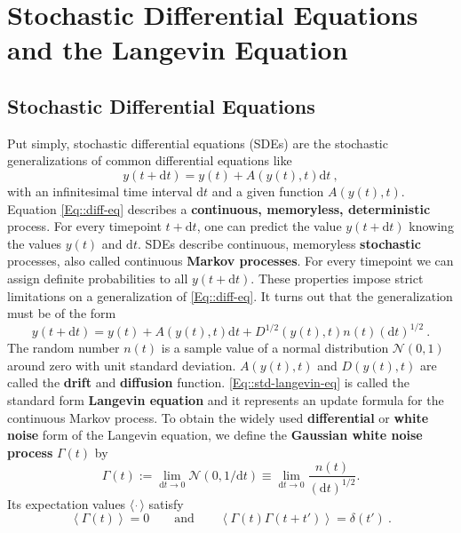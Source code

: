 	\section{Stochastic Differential Equations and the Langevin Equation}
	\subsection{Stochastic Differential Equations}
	Put simply, stochastic differential equations (SDEs) are the stochastic generalizations of common differential equations like
	\begin{equation} \label{Eq::diff-eq}
		y(t + \text{d}t) =	y(t) + A(y(t), t) \mathrm{d}t ~,
	\end{equation}
	with an  infinitesimal time interval $\text{d}t$ and a given function $A(y(t), t)$. Equation \eqref{Eq::diff-eq} describes a \textbf{continuous, memoryless, deterministic} process. For every timepoint $t + \text{d}t$, one can predict the value $y(t+\text{d}t)$ knowing the values $y(t)$ and $\text{d}t$. SDEs describe continuous, memoryless \textbf{stochastic} processes, also called continuous \textbf{Markov processes}. For every timepoint we can assign definite probabilities to all $y(t + \text{d}t)$. These properties impose strict limitations on a generalization of \autoref{Eq::diff-eq}. It turns out that the generalization must be of the form \cite{gillespie1996mathematics}
	\begin{equation} \label{Eq::std-langevin-eq}
		y(t + \text{d}t) =	y(t) + A(y(t), t) \text{d}t + D^{1/2} \left(y(t), t\right) n(t) (\text{d}t)^{1/2}~.
	\end{equation}
	The random number $n(t)$ is a sample value of a normal distribution $\mathcal{N}(0,1)$ around zero with unit standard deviation. $A(y(t), t)$ and $D(y(t), t)$ are called the \textbf{drift} and \textbf{diffusion} function. \autoref{Eq::std-langevin-eq} is called the standard form \textbf{Langevin equation} and it represents an update formula for the continuous Markov process. To obtain the widely used \textbf{differential }or \textbf{white noise }form of the Langevin equation, we define the \textbf{Gaussian white noise process} $\Gamma(t)$ by
	\begin{equation}
		\Gamma(t) :=	\lim\limits_{\text{d}t \rightarrow 0} \mathcal{N}(0, 1/\text{d}t) \equiv \lim\limits_{\text{d}t \rightarrow 0} \frac{n(t)}{(\text{d}t)^{1/2}}.
	\end{equation}
	Its expectation values $\langle~\dot~\rangle$ satisfy
	\begin{equation}
		\left \langle \Gamma(t) \right \rangle = 0 \qquad \text{and} \qquad  			\left \langle \Gamma(t) \Gamma(t + t')\right \rangle =	\delta(t') ~.
	\end{equation}
